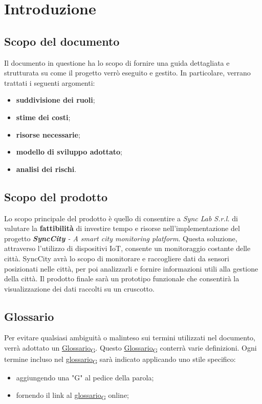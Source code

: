 \section{Introduzione}
\setcounter{subsection}{0}
\subsection{Scopo del documento}
Il documento in questione ha lo scopo di fornire una guida dettagliata e strutturata su come il progetto verrò eseguito e gestito. In particolare, verrano trattati i seguenti argomenti:
\begin{itemize}
    \item \textbf{suddivisione dei ruoli};
    \item \textbf{stime dei costi};
    \item \textbf{risorse necessarie};
    \item \textbf{modello di sviluppo adottato};
    \item \textbf{analisi dei rischi}.
\end{itemize}

\subsection{Scopo del prodotto}
Lo scopo principale del prodotto è quello di consentire a \textit{Sync Lab S.r.l.} di valutare la \textbf{fattibilità} di investire tempo e risorse nell'implementazione del progetto  \textit{\textbf{SyncCity} - A smart city monitoring platform}. Questa soluzione, attraverso l'utilizzo di dispositivi IoT, consente un monitoraggio costante delle città. SyncCity avrà lo scopo di monitorare e raccogliere dati da sensori posizionati nelle città, per poi analizzarli e fornire informazioni utili alla gestione della città. Il prodotto finale sarà un prototipo funzionale che consentirà la visualizzazione dei dati raccolti su un cruscotto.

\subsection{Glossario}
Per evitare qualsiasi ambiguità o malinteso sui termini utilizzati nel documento, verrà adottato un \href{https://7last.github.io/docs/rtb/documentazione-interna/glossario#glossario}{Glossario\textsubscript{G}}. Questo \href{https://7last.github.io/docs/rtb/documentazione-interna/glossario#glossario}{Glossario\textsubscript{G}} conterrà varie definizioni. Ogni termine incluso nel \href{https://7last.github.io/docs/rtb/documentazione-interna/glossario#glossario}{glossario\textsubscript{G}} sarà indicato applicando uno stile specifico:
\begin{itemize}
    \item aggiungendo una "G" al pedice della parola;
    \item fornendo il link al \href{https://7last.github.io/docs/rtb/documentazione-interna/glossario\#glossario}{glossario\textsubscript{G}} online;
\end{itemize}


